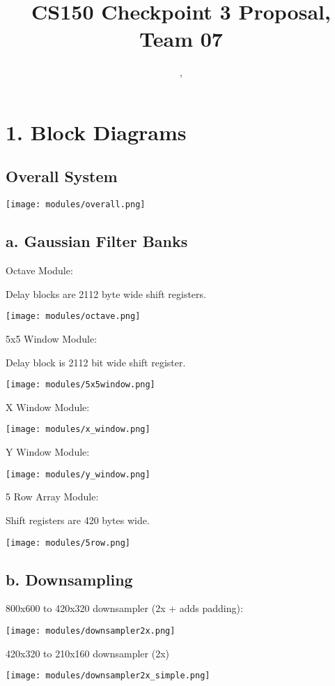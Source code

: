 \documentclass[11pt]{article}
\title{CS150 Checkpoint 3 Proposal, Team 07}
\author{\Name, \texttt{\Login}}
\begin{document}
\maketitle
\section*{1. Block Diagrams}

\subsection*{Overall System}

\noindent\texttt{[image: modules/overall.png]}

\subsection*{a. Gaussian Filter Banks}

Octave Module:

Delay blocks are 2112 byte wide shift registers.

\noindent\texttt{[image: modules/octave.png]}

5x5 Window Module:

Delay block is 2112 bit wide shift register.

\noindent\texttt{[image: modules/5x5window.png]}

X Window Module:

\noindent\texttt{[image: modules/x\_window.png]}

Y Window Module:

\noindent\texttt{[image: modules/y\_window.png]}

5 Row Array Module:

Shift registers are 420 bytes wide.

\noindent\texttt{[image: modules/5row.png]}

\subsection*{b. Downsampling}

800x600 to 420x320 downsampler (2x + adds padding):

\noindent\texttt{[image: modules/downsampler2x.png]}

420x320 to 210x160 downsampler (2x)

\noindent\texttt{[image: modules/downsampler2x\_simple.png]}
\end{document}

